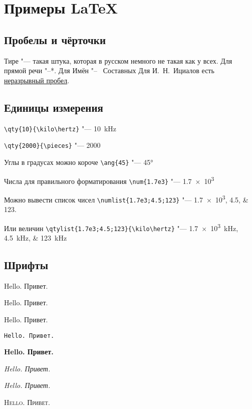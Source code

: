 
\section{Примеры \LaTeX}

\subsection{Пробелы и чёрточки}
Тире "--- такая штука, которая в русском немного не такая как у всех.
Для прямой речи "--*. Для Имён "--~ Составных
Для И.~Н.~Ициалов есть \href{https://ru.wikibooks.org/wiki/LaTeX/%D0%A4%D0%BE%D1%80%D0%BC%D0%B0%D1%82%D0%B8%D1%80%D0%BE%D0%B2%D0%B0%D0%BD%D0%B8%D0%B5_%D1%82%D0%B5%D0%BA%D1%81%D1%82%D0%B0#%D0%9D%D0%B5%D1%80%D0%B0%D0%B7%D1%80%D1%8B%D0%B2%D0%BD%D1%8B%D0%B9_%D0%BF%D1%80%D0%BE%D0%B1%D0%B5%D0%BB}{неразрывный пробел}.

\subsection{Единицы измерения}
\verb!\qty{10}{\kilo\hertz}! "--- \qty{10}{\kilo\hertz}

\verb!\qty{2000}{\pieces}! "--- \qty{2000}{\pieces}

Углы в градусах можно короче \verb!\ang{45}! "--- \ang{45}

Числа для правильного форматирования \verb!\num{1.7e3}! "--- \num{1.7e3}

Можно вывести список чисел \verb!\numlist{1.7e3;4.5;123}! "--- \numlist{1.7e3;4.5;123}.

Или величин \verb!\qtylist{1.7e3;4.5;123}{\kilo\hertz}! "--- \qtylist{1.7e3;4.5;123}{\kilo\hertz}

\subsection{Шрифты}
\textmd{Hello. Привет.}

\textsf{Hello. Привет.}

\textrm{Hello. Привет.}

\texttt{Hello. Привет.}

\textbf{Hello. Привет.}

\textit{Hello. Привет.}

\textsl{Hello. Привет.}

\textsc{Hello. Привет.}
